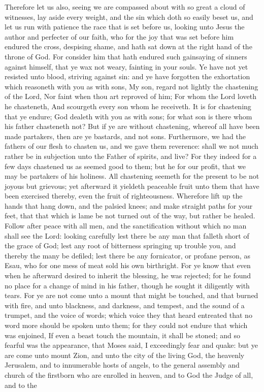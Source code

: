 Therefore let us also, seeing we are compassed about with so great a cloud of witnesses, lay aside every weight, and the sin which doth so easily beset us, and let us run with patience the race that is set before us, looking unto Jesus the author and perfecter of our faith, who for the joy that was set before him endured the cross, despising shame, and hath sat down at the right hand of the throne of God. For consider him that hath endured such gainsaying of sinners against himself, that ye wax not weary, fainting in your souls. Ye have not yet resisted unto blood, striving against sin: and ye have forgotten the exhortation which reasoneth with you as with sons, My son, regard not lightly the chastening of the Lord, Nor faint when thou art reproved of him;  For whom the Lord loveth he chasteneth, And scourgeth every son whom he receiveth.  It is for chastening that ye endure; God dealeth with you as with sons; for what son is there whom his father chasteneth not? But if ye are without chastening, whereof all have been made partakers, then are ye bastards, and not sons. Furthermore, we had the fathers of our flesh to chasten us, and we gave them reverence: shall we not much rather be in subjection unto the Father of spirits, and live? For they indeed for a few days chastened us as seemed good to them; but he for our profit, that we may be partakers of his holiness. All chastening seemeth for the present to be not joyous but grievous; yet afterward it yieldeth peaceable fruit unto them that have been exercised thereby, even the fruit of righteousness. Wherefore lift up the hands that hang down, and the palsied knees; and make straight paths for your feet, that that which is lame be not turned out of the way, but rather be healed.  Follow after peace with all men, and the sanctification without which no man shall see the Lord: looking carefully lest there be any man that falleth short of the grace of God; lest any root of bitterness springing up trouble you, and thereby the many be defiled; lest there be any fornicator, or profane person, as Esau, who for one mess of meat sold his own birthright. For ye know that even when he afterward desired to inherit the blessing, he was rejected; for he found no place for a change of mind in his father, though he sought it diligently with tears.  For ye are not come unto a mount that might be touched, and that burned with fire, and unto blackness, and darkness, and tempest, and the sound of a trumpet, and the voice of words; which voice they that heard entreated that no word more should be spoken unto them; for they could not endure that which was enjoined, If even a beast touch the mountain, it shall be stoned; and so fearful was the appearance, that Moses said, I exceedingly fear and quake: but ye are come unto mount Zion, and unto the city of the living God, the heavenly Jerusalem, and to innumerable hosts of angels, to the general assembly and church of the firstborn who are enrolled in heaven, and to God the Judge of all, and to the 